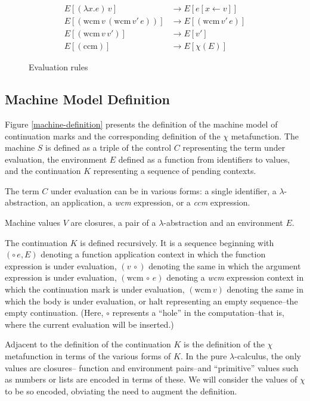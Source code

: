 \documentclass[ms]{byuprop}
\newcounter{definition}
\begin{document}
\begin{figure}
\begin{align*}
E[(\lambda x.e)\,v]                         &\rightarrow E[e[x\leftarrow v]]\\
E[(\mathrm{wcm}\,v\,(\mathrm{wcm}\,v'\,e))] &\rightarrow E[(\mathrm{wcm}\,v'\,e)]\\
E[(\mathrm{wcm}\,v\,v')]                    &\rightarrow E[v']\\
E[(\mathrm{ccm})]                           &\rightarrow E[\chi(E)]
\end{align*}
\caption{Evaluation rules}
\label{language-semantics}
\end{figure}

\subsection{Machine Model Definition}

Figure \ref{machine-definition} presents the definition of the machine model of continuation 
marks and the corresponding definition of the $\chi$ metafunction. The machine $S$ is defined 
as a triple of the control $C$ representing the term under evaluation, the environment $E$ 
defined as a function from identifiers to values, and the continuation $K$ representing a 
sequence of pending contexts.

The term $C$ under evaluation can be in various forms: a single identifier, a $\lambda$-abstraction, 
an application, a \emph{wcm} expression, or a \emph{ccm} expression.

Machine values $V$ are closures, a pair of a $\lambda$-abstraction and an environment $E$.

The continuation $K$ is defined recursively. It is a sequence beginning with $(\circ\,e,E)$ 
denoting a function application context in which the function expression is under evaluation, 
$(v\,\circ)$ denoting the same in which the argument expression is under evaluation, $(\mathrm{wcm}\,
\circ\,e)$ denoting a \emph{wcm} expression context in which the continuation mark is under 
evaluation, $(\mathrm{wcm}\,v)$ denoting the same in which the body is under evaluation, or 
$\mathrm{halt}$ representing an empty sequence--the empty continuation. (Here, $\circ$ 
represents a ``hole'' in the computation--that is, where the current evaluation will be inserted.) 

Adjacent to the definition of the continuation $K$ is the definition of the $\chi$ metafunction 
in terms of the various forms of $K$. In the pure $\lambda$-calculus, the only values are closures--
function and environment pairs--and ``primitive'' values such as numbers or lists are encoded in 
terms of these. We will consider the values of $\chi$ to be so encoded, obviating the need to 
augment the definition.
\end{document}
